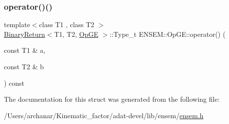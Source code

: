 \subsubsection{\texorpdfstring{operator()()}{operator()()}\hspace{0.1cm}{\footnotesize\ttfamily [3/3]}}
{\footnotesize\ttfamily template$<$class T1 , class T2 $>$ \\
\mbox{\hyperlink{structENSEM_1_1BinaryReturn}{Binary\+Return}}$<$T1, T2, \mbox{\hyperlink{structENSEM_1_1OpGE}{Op\+GE}} $>$\+::Type\+\_\+t E\+N\+S\+E\+M\+::\+Op\+G\+E\+::operator() (\begin{DoxyParamCaption}\item[{const T1 \&}]{a,  }\item[{const T2 \&}]{b }\end{DoxyParamCaption}) const\hspace{0.3cm}{\ttfamily [inline]}}



The documentation for this struct was generated from the following file\+:\begin{DoxyCompactItemize}
\item 
/\+Users/archanar/\+Kinematic\+\_\+factor/adat-\/devel/lib/ensem/\mbox{\hyperlink{adat-devel_2lib_2ensem_2ensem_8h}{ensem.\+h}}\end{DoxyCompactItemize}
